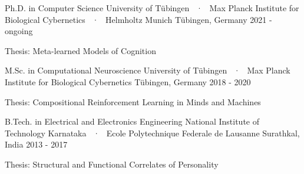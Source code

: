 \begin{cventries}
\vspace{5mm}
  \cventryEd
    {Ph.D. in Computer Science} %
    {University of Tübingen ~·~ Max Planck Institute for Biological Cybernetics  ~·~ Helmholtz Munich} %
    {}
    {Tübingen, Germany} %
    {2021 - ongoing} %
  {\begin{cvitems} \item Thesis: Meta-learned Models of Cognition %
  \end{cvitems}}

  \cventryEd
    {M.Sc. in Computational Neuroscience} %
    {University of Tübingen ~·~ Max Planck Institute for Biological Cybernetics} %
    {}
    {Tübingen, Germany} %
    {2018 - 2020} %
  {\begin{cvitems} \item Thesis: Compositional Reinforcement Learning in Minds and Machines %
  \end{cvitems}}


  \cventryEd
    {B.Tech.  in Electrical and Electronics Engineering} %
    {National Institute of Technology Karnataka ~·~ Ecole Polytechnique Federale de Lausanne} %
    {}
    {Surathkal, India} %
    {2013 - 2017} %
    {\begin{cvitems}\item Thesis: Structural and Functional Correlates of Personality
    \end{cvitems}}

\end{cventries}